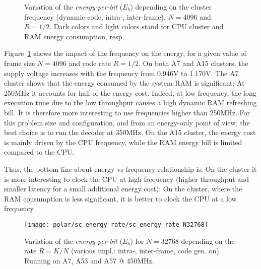 \begin{figure}[htp]
  \centering
  \quad
  \caption{Variation of the \emph{energy-per-bit} ($E_b$) depending on the
    cluster frequency (dynamic code, intra-, inter-frame). $N = 4096$ and
    $R = 1/2$. Dark colors and light colors stand for CPU cluster and RAM energy
    consumption, resp.}
  \label{plot:eval_polar_sc_energy_freq}
\end{figure}

Figure~\ref{plot:eval_polar_sc_energy_freq} shows the impact of the frequency on
the energy, for a given value of frame size $N=4096$ and code rate $R=1/2$. On
both A7 and A15 clusters, the supply voltage increases with the frequency from
0.946V to 1.170V. The A7 \little cluster shows that the energy consumed by the
system RAM is significant: At 250MHz it accounts for half of the energy cost.
Indeed, at low frequency, the long execution time due to the low throughput
causes a high dynamic RAM refreshing bill. It is therefore more interesting to
use frequencies higher than 250MHz. For this problem size and configuration, and
from an energy-only point of view, the best choice is to run the decoder at
350MHz. On the A15 \big cluster, the energy cost is mainly driven by the CPU
frequency, while the RAM energy bill is limited compared to the CPU.

Thus, the bottom line about energy vs frequency relationship is: On the \little
cluster it is more interesting to clock the CPU at high frequency (higher
throughput and smaller latency for a small additional energy cost); On the
\big cluster, where the RAM consumption is less significant, it is better to
clock the CPU at a low frequency.

\begin{figure}[htp]
  \centering
  \texttt{[image: polar/sc\_energy\_rate/sc\_energy\_rate\_N32768]}
  \caption{Variation of the \emph{energy-per-bit} ($E_b$) for $N = 32768$
    depending on the rate $R = K / N$ (various impl.: intra-, inter-frame, code
    gen. on). Running on A7, A53 and A57 @ 450MHz.}
  \label{plot:eval_polar_sc_energy_rate}
\end{figure}

